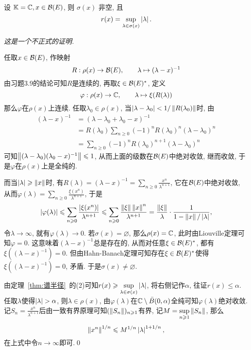 	\begin{Theorem}[谱半径定理]\label{thm:谱半径定理}
		设 $ \mathbb{K}=\mathbb{C}, x\in\mathcal{B}(E) $, 则 $ \sigma(x) $ 非空, 且
		\[
			r(x)=\sup_{\lambda\in\sigma(x)}\left| \lambda \right| .
		\]
	\end{Theorem}
	\begin{Proof}
		\textsl{这是一个不正式的证明.}
		
		任取$ x\in\mathcal{B}(E) $, 作映射
		\[
		R : \rho(x)\to\mathcal{B}(E),\qquad \lambda\mapsto(\lambda-x)^{-1}
		\]
		由习题3.9的结论可知$ R $是连续的, 再取$ \xi\in\mathcal{B}(E)^{*} $, 定义
		\[
		\varphi : \rho(x)\to\mathbb{C},\qquad \lambda\mapsto\xi(R(\lambda))
		\]
		那么$ \varphi $在$ \rho(x) $上连续. 任取$ \lambda_0\in\rho(x) $, 当$ \left| \lambda-\lambda_0 \right| <1/\left\| R(\lambda_0) \right\| $时, 由
		\[
		\begin{aligned}
		(\lambda-x)^{-1}&=(\lambda-\lambda_0+\lambda_0-x)^{-1}\\
		&=R(\lambda_0)\sum_{n\geqslant 0}(-1)^nR(\lambda_0)^n(\lambda-\lambda_0)^n\\
		&=\sum_{n\geqslant 0}(-1)^nR(\lambda_0)^{n+1}(\lambda-\lambda_0)^n
		\end{aligned}
		\]
		可知$ \left\| (\lambda-\lambda_0)(\lambda_0-x)^{-1} \right\|\leqslant 1 $, 从而上面的级数在$ \mathcal{B}(E) $中绝对收敛, 继而收敛, 于是$ \varphi $在$ \rho(x) $上是全纯的.
		
		而当$ \left| \lambda \right| \geqslant\left\| x \right\| $时, 有$ R(\lambda)=(\lambda-x)^{-1}=\sum\limits_{n\geqslant 0}\frac{x^n}{\lambda^{n+1}} $, 它在$ \mathcal{B}(E) $中绝对收敛, 从而$ \varphi(\lambda)=\sum\limits_{n\geqslant 0}\frac{\xi(x^n)}{\lambda^{n+1}} $, 于是
		\[
		\left| \varphi(\lambda) \right| \leqslant\sum_{n\geqslant 0}\frac{\left| \xi(x^n) \right| }{\lambda^{n+1}}\leqslant\sum_{n\geqslant 0}\frac{\left\| \xi \right\|\left\| x \right\|^n}{\lambda^{n+1}}=\frac{\left\| \xi \right\|}{\lambda}\cdot\frac{1}{1-\left\| x \right\|/\left| \lambda \right| },
		\]
		令$ \lambda\to\infty $, 就有$ \varphi(\lambda)\to 0 $. 若$ \sigma(x)=\varnothing $, 那么$ \rho(x)=\mathbb{C} $, 此时由Liouville定理可知$ \varphi=0 $. 这意味着$ (\lambda-x)^{-1} $总是存在的, 从而对任意$ \xi\in\mathcal{B}(E)^{*} $, 都有$ \xi((\lambda-x)^{-1})=0 $. 但由Hahn-Banach定理可知存在$ \xi\in\mathcal{B}(E)^{*} $使得$ \xi((\lambda-x)^{-1})=0 $, 矛盾. 于是$ \sigma(x)\ne\varnothing $.
		
		由定理~\ref{thm:谱半径}~的(2)可知$ r(x)\geqslant\sup\limits_{\lambda\in\sigma(x)}\left| \lambda \right|  $, 将右侧记作$ \alpha $, 往证$ r(x)\leqslant\alpha $. 任取$ \lambda $使得$ \left| \lambda \right| >\alpha $, 则$ \lambda\in\rho(x) $, 由$ \varphi(\lambda) $在$ \mathbb{C}\setminus\bar{B}(0,\alpha) $全纯可知$ \varphi(\lambda) $绝对收敛. 记$ S_n=\frac{x^n}{\lambda^{n+1}} $后由一致有界原理可知$ (\left\| S_n \right\|)_{n\geqslant 1} $有界, 记$ M=\sup\limits_{n\geqslant 1}\left\| S_n \right\| $, 那么
		\[
		\left\| x^n \right\|^{1/n}\leqslant M^{1/n}\left| \lambda \right| ^{1+1/n},
		\]
		在上式中令$ n\to\infty $即可.\qed
	\end{Proof}

